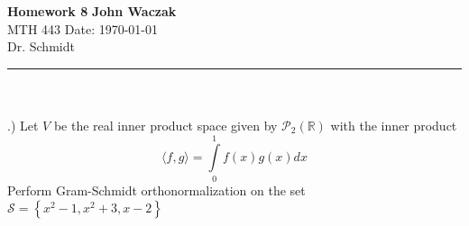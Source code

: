 \documentclass[a4paper, 11pt]{article}
\newcommand{\R}{\mathbb{R}}
\begin{document}
\noindent
\large\textbf{Homework 8} \hfill \textbf{John Waczak} \\
\normalsize MTH 443 \hfill  Date: \today \\
Dr. Schmidt  
\par\noindent\rule{\textwidth}{0.4pt} \\\\

.) Let $V$ be the real inner product space given by $\mathcal{P}_2(\R)$ with the inner product
\begin{equation*}
  \langle f, g \rangle = \int\limits_0^1 f(x)g(x)dx
\end{equation*}
Perform Gram-Schmidt orthonormalization on the set $\mathcal{S}=\left\{ x^2-1, x^2+3, x-2 \right\}$ \\
\end{document}
